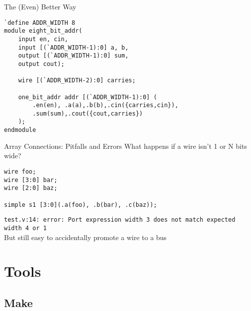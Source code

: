 \documentclass[dvipsnames]{beamer}
\begin{document}
\begin{frame}[fragile]{The (Even) Better Way}
\begin{verbatim}
`define ADDR_WIDTH 8
module eight_bit_addr(
    input en, cin,
    input [(`ADDR_WIDTH-1):0] a, b,
    output [(`ADDR_WIDTH-1):0] sum,
    output cout);

    wire [(`ADDR_WIDTH-2):0] carries;

    one_bit_addr addr [(`ADDR_WIDTH-1):0] (
        .en(en), .a(a),.b(b),.cin({carries,cin}),
        .sum(sum),.cout({cout,carries})
    );
endmodule
\end{verbatim}
\end{frame}

\begin{frame}[fragile]{Array Connections: Pitfalls and Errors}
What happens if a wire isn't 1 or N bits wide?
\begin{verbatim}
wire foo;
wire [3:0] bar;
wire [2:0] baz;

simple s1 [3:0](.a(foo), .b(bar), .c(baz));
\end{verbatim}
\scriptsize{\texttt{test.v:14: error: Port expression width 3 does not match expected width 4
or 1}} \normalsize \\
But still easy to accidentally promote a wire to a bus
\end{frame}


\section{Tools}

\subsection{Make}
\end{document}
